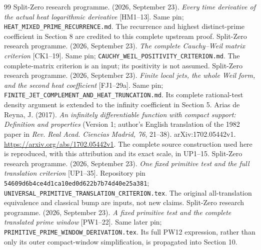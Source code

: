 \documentclass[11pt,a4paper]{article}
\theoremstyle{definition}\newtheorem{definition}[theorem]{Definition}
\begin{document}
\begin{thebibliography}{99}
 Split-Zero research programme. (2026, September 23). \emph{Every time derivative of the actual heat logarithmic derivative} [HM1--13]. Same pin; \texttt{HEAT\_MIXED\_PRIME\_RECURRENCE.md}. The recurrence and highest distinct-prime coefficient in Section 8 are credited to this complete upstream proof.
 Split-Zero research programme. (2026, September 23). \emph{The complete Cauchy--Weil matrix criterion} [CK1--19]. Same pin; \texttt{CAUCHY\_WEIL\_POSITIVITY\_CRITERION.md}. The complete-matrix criterion is an input; its positivity is not assumed.
 Split-Zero research programme. (2026, September 23). \emph{Finite local jets, the whole Weil form, and the second heat coefficient} [FJ1--29a]. Same pin; \texttt{FINITE\_JET\_COMPLEMENT\_AND\_HEAT\_TRUNCATION.md}. Its complete rational-test density argument is extended to the infinity coefficient in Section 5.
 Arias de Reyna, J. (2017). \emph{An infinitely differentiable function with compact support: Definition and properties} (Version 1; author's English translation of the 1982 paper in \emph{Rev. Real Acad. Ciencias Madrid, 76}, 21--38). arXiv:1702.05442v1. \url{https://arxiv.org/abs/1702.05442v1}. The complete source construction used here is reproduced, with this attribution and its exact scale, in UP1--15.
 Split-Zero research programme. (2026, September 23). \emph{One fixed primitive test and the full translation criterion} [UP1--35]. Repository pin \texttt{54609d6b4ce4d1ca10ed0d622b7b74d40e25a381}; \texttt{UNIVERSAL\_PRIMITIVE\_TRANSLATION\_CRITERION.tex}. The original all-translation equivalence and classical bump are inputs, not new claims.
 Split-Zero research programme. (2026, September 23). \emph{A fixed primitive test and the complete translated prime window} [PW1--22]. Same later pin; \texttt{PRIMITIVE\_PRIME\_WINDOW\_DERIVATION.tex}. Its full PW12 expression, rather than only its outer compact-window simplification, is propagated into Section 10.
\end{thebibliography}
\end{document}
